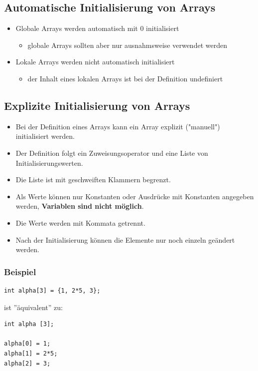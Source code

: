 \subsection{Automatische Initialisierung von Arrays}
\begin{itemize}
	\item Globale Arrays werden automatisch mit 0 initialisiert
	\begin{itemize}
		\item globale Arrays sollten aber nur ausnahmsweise verwendet werden
	\end{itemize}
	\item Lokale Arrays werden nicht automatisch initialisiert
	\begin{itemize}
		\item der Inhalt eines lokalen Arrays ist bei der Definition undefiniert
	\end{itemize}
\end{itemize}

\subsection{Explizite Initialisierung von Arrays}
\begin{itemize}
	\item Bei der Definition eines Arrays kann ein Array explizit ("manuell") initialisiert werden.
	\item Der Definition folgt ein Zuweisungsoperator und eine Liste von Initialisierungswerten.
	\item Die Liste ist mit geschweiften Klammern begrenzt.
	\item Als Werte können nur Konstanten oder Ausdrücke mit Konstanten angegeben werden, \textbf{Variablen sind nicht möglich}.
	\item Die Werte werden mit Kommata getrennt.
	\item Nach der Initialisierung können die Elemente nur noch einzeln geändert werden.
\end{itemize}

\subsubsection{Beispiel}
\noindent
\begin{minipage}{0.35\linewidth}
\begin{lstlisting}
int alpha[3] = {1, 2*5, 3};
\end{lstlisting}
\end{minipage}
\hspace{0.01\linewidth}
ist ''äquivalent'' zu:
\hspace{0.01\linewidth}
\noindent
\begin{minipage}{0.2\linewidth}
\begin{lstlisting}
int alpha [3];

alpha[0] = 1;
alpha[1] = 2*5;
alpha[2] = 3;
\end{lstlisting}
\end{minipage}

